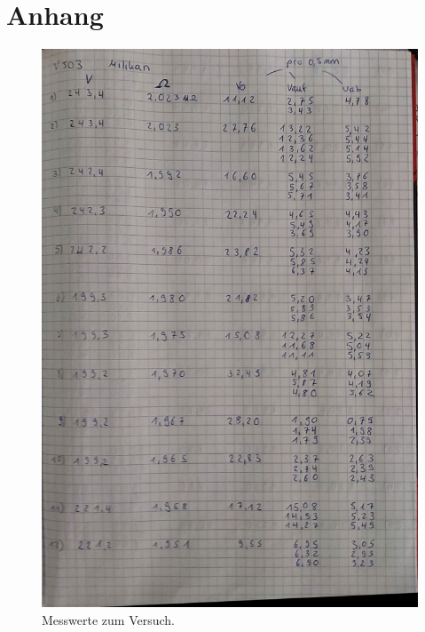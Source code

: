 \section{Anhang}\label{sec:Anhang}
\begin{figure}[H]
   \centering
    \includegraphics[scale=0.45]{Abbildungen/KladdeS1.jpeg}
   \caption{Messwerte zum Versuch.}
\end{figure}
